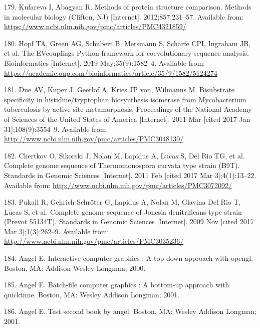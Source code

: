 \documentclass[12pt,twoside]{reedthesis}
\begin{document}
  \hypertarget{ref-kufareva_methods_2012}{}
  179. Kufareva I, Abagyan R. Methods of protein structure comparison.
  Methods in molecular biology (Clifton, NJ) {[}Internet{]}.
  2012;857:231--57. Available from:
  \url{https://www.ncbi.nlm.nih.gov/pmc/articles/PMC4321859/}
  
  \hypertarget{ref-hopf_evcouplings_2019}{}
  180. Hopf TA, Green AG, Schubert B, Mersmann S, Schärfe CPI, Ingraham
  JB, et al. The EVcouplings Python framework for coevolutionary sequence
  analysis. Bioinformatics {[}Internet{]}. 2019 May;35(9):1582--4.
  Available from:
  \url{https://academic.oup.com/bioinformatics/article/35/9/1582/5124274}
  
  \hypertarget{ref-due_bisubstrate_2011}{}
  181. Due AV, Kuper J, Geerlof A, Kries JP von, Wilmanns M. Bisubstrate
  specificity in histidine/tryptophan biosynthesis isomerase from
  Mycobacterium tuberculosis by active site metamorphosis. Proceedings of
  the National Academy of Sciences of the United States of America
  {[}Internet{]}. 2011 Mar {[}cited 2017 Jan 31{]};108(9):3554--9.
  Available from:
  \url{http://www.ncbi.nlm.nih.gov/pmc/articles/PMC3048130/}
  
  \hypertarget{ref-chertkov_complete_2011}{}
  182. Chertkov O, Sikorski J, Nolan M, Lapidus A, Lucas S, Del Rio TG, et
  al. Complete genome sequence of Thermomonospora curvata type strain
  (B9T). Standards in Genomic Sciences {[}Internet{]}. 2011 Feb {[}cited
  2017 Mar 3{]};4(1):13--22. Available from:
  \url{http://www.ncbi.nlm.nih.gov/pmc/articles/PMC3072092/}
  
  \hypertarget{ref-pukall_complete_2009}{}
  183. Pukall R, Gehrich-Schröter G, Lapidus A, Nolan M, Glavina Del Rio
  T, Lucas S, et al. Complete genome sequence of Jonesia denitrificans
  type strain (Prevot 55134T). Standards in Genomic Sciences
  {[}Internet{]}. 2009 Nov {[}cited 2017 Mar 3{]};1(3):262--9. Available
  from: \url{http://www.ncbi.nlm.nih.gov/pmc/articles/PMC3035236/}
  
  \hypertarget{ref-angel2000}{}
  184. Angel E. Interactive computer graphics : A top-down approach with
  opengl. Boston, MA: Addison Wesley Longman; 2000.
  
  \hypertarget{ref-angel2001}{}
  185. Angel E. Batch-file computer graphics : A bottom-up approach with
  quicktime. Boston, MA: Wesley Addison Longman; 2001.
  
  \hypertarget{ref-angel2002a}{}
  186. Angel E. Test second book by angel. Boston, MA: Wesley Addison
  Longman; 2001.


\end{document}
